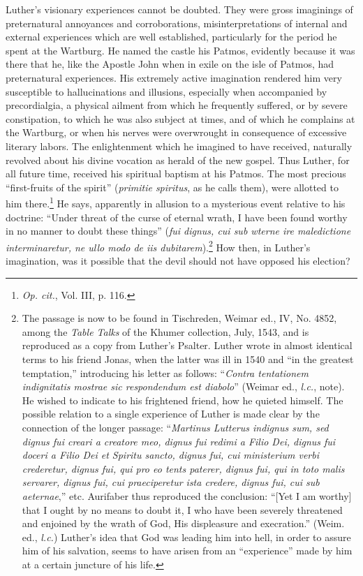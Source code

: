 Luther’s visionary experiences cannot be doubted. They were gross
imaginings of preternatural annoyances and corroborations, misinterpretations
of internal and external experiences which are well established, particularly
for the period he spent at the Wartburg. He
named the castle his Patmos, evidently because it was there that he,
like the Apostle John when in exile on the isle of Patmos, had
preternatural experiences. His extremely active imagination rendered him
very susceptible to hallucinations and illusions, especially
when accompanied by precordialgia, a physical ailment from which
he frequently suffered, or by severe constipation, to which he was
also subject at times, and of which he complains at the Wartburg, or
when his nerves were overwrought in consequence of excessive literary labors.
The enlightenment which he imagined to have received, naturally
revolved about his divine vocation as herald of the new gospel. Thus
Luther, for all future time, received his spiritual baptism at his Patmos.
The most precious “first-fruits of the spirit” (\textit{primitie spiritus},
as he calls them), were allotted to him there.\footnote{\textit{Op. cit.}, Vol. III, p. 116.}
He says, apparently
in allusion to a mysterious event relative to his doctrine: “Under
threat of the curse of eternal wrath, I have been found worthy in no
manner to doubt these things” (\textit{fui dignus, cui sub wterne ire maledictione
interminaretur, ne ullo modo de iis dubitarem}).\footnote
{The passage is now to be found in Tischreden, Weimar ed., IV, No. 4852, among the
\textit{Table Talks} of the Khumer collection, July, 1543, and is reproduced as a copy from
Luther’s Psalter. Luther wrote in almost identical terms to his friend Jonas, when the latter
was ill in 1540 and “in the greatest temptation,” introducing his letter as follows: “\textit{Contra
tentationem indignitatis mostrae sic respondendum est diabolo}” (Weimar ed., \textit{l.c.}, note). He
wished to indicate to his frightened friend, how he quieted himself. The possible relation
to a single experience of Luther is made clear by the connection of the longer passage:
“\textit{Martinus Lutterus indignus sum, sed dignus fui creari a creatore meo, dignus fui redimi a
Filio Dei, dignus fui doceri a Filio Dei et Spiritu sancto, dignus fui, cui ministerium verbi
crederetur, dignus fui, qui pro eo tents paterer, dignus fui, qui in toto malis servarer,
dignus fui, cui praeciperetur ista credere, dignus fui, cui sub aeternae},” etc. Aurifaber thus
reproduced the conclusion: “[Yet I am worthy] that I ought by no means to doubt it, I
who have been severely threatened and enjoined by the wrath of God, His displeasure and
execration.” (Weim. ed., \textit{l.c.}) Luther’s idea that God was leading him into hell, in order to
assure him of his salvation, seems to have arisen from an “experience” made by him at a
certain juncture of his life.}
How then,
in Luther’s imagination, was it possible that the devil should not have
opposed his election?


